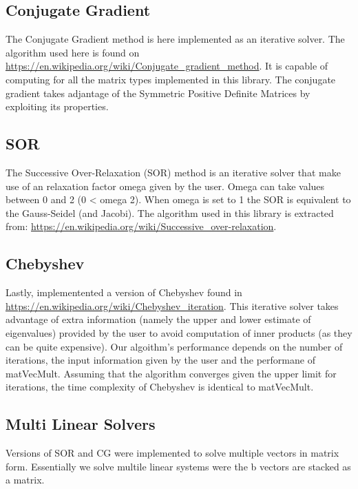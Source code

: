 \documentclass[11pt]{article}
\begin{document}
\subsection{Conjugate Gradient}
\label{sec:orge118032}
The Conjugate Gradient method is here implemented as an iterative solver.
The algorithm used here is found on \url{https://en.wikipedia.org/wiki/Conjugate\_gradient\_method}.
It is capable of computing for all the matrix types implemented in this library. 
The conjugate gradient takes adjantage of the Symmetric Positive Definite Matrices
by exploiting its properties.

\subsection{SOR}
\label{sec:org0bbda72}
The Successive Over-Relaxation (SOR) method is an iterative solver that make use
of an relaxation factor omega given by the user. Omega can take values between 
0 and 2 (0 < omega 2). When omega is set to 1 the SOR is equivalent to the 
Gauss-Seidel (and Jacobi). The algorithm used in this library is extracted from:
\url{https://en.wikipedia.org/wiki/Successive\_over-relaxation}.

\subsection{Chebyshev}
\label{sec:org60e7a9b}
Lastly, implementented a version of Chebyshev found in
\url{https://en.wikipedia.org/wiki/Chebyshev\_iteration}. This iterative solver takes
advantage of extra information (namely the upper and lower estimate of
eigenvalues) provided by the user to avoid computation of inner products (as
they can be quite expensive). Our algoithm's performance depends on the number
of iterations, the input information given by the user and the performane of
matVecMult. Assuming that the algorithm converges given the upper limit for
iterations, the time complexity of Chebyshev is identical to matVecMult.

\subsection{Multi Linear Solvers}
\label{sec:org574ff54}
Versions of SOR and CG were implemented to solve multiple vectors in matrix
form. Essentially we solve multile linear systems were the b vectors are stacked
as a matrix.
\end{document}

